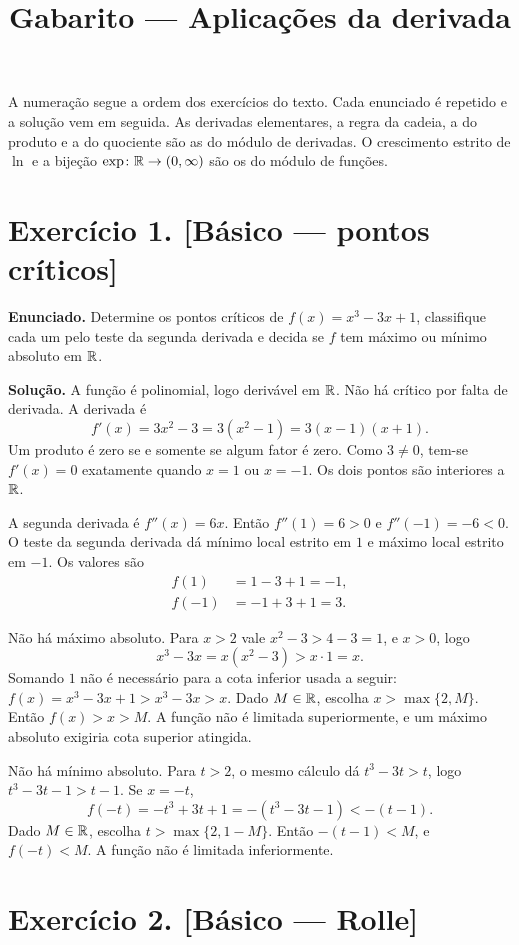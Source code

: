 \documentclass[11pt,a4paper]{article}
\title{Gabarito --- Aplicações da derivada}
\author{}
\date{}
\begin{document}
\maketitle
\tableofcontents

A numeração segue a ordem dos exercícios do texto. Cada enunciado é repetido e a solução vem em seguida. As derivadas elementares, a regra da cadeia, a do produto e a do quociente são as do módulo de derivadas. O crescimento estrito de $\ln$ e a bijeção $\exp\colon\mathbb{R}\to(0,\infty)$ são os do módulo de funções.

\section*{Exercício 1. [Básico --- pontos críticos]}

\textbf{Enunciado.} Determine os pontos críticos de $f(x)=x^3-3x+1$, classifique cada um pelo teste da segunda derivada e decida se $f$ tem máximo ou mínimo absoluto em $\mathbb{R}$.

\textbf{Solução.}
A função é polinomial, logo derivável em $\mathbb{R}$. Não há crítico por falta de derivada. A derivada é
\[
f'(x)=3x^2-3=3(x^2-1)=3(x-1)(x+1).
\]
Um produto é zero se e somente se algum fator é zero. Como $3\neq 0$, tem-se $f'(x)=0$ exatamente quando $x=1$ ou $x=-1$. Os dois pontos são interiores a $\mathbb{R}$.

A segunda derivada é $f''(x)=6x$. Então $f''(1)=6>0$ e $f''(-1)=-6<0$. O teste da segunda derivada dá mínimo local estrito em $1$ e máximo local estrito em $-1$. Os valores são
\begin{align*}
f(1)&=1-3+1=-1,\\
f(-1)&=-1+3+1=3.
\end{align*}

Não há máximo absoluto. Para $x>2$ vale $x^2-3>4-3=1$, e $x>0$, logo
\[
x^3-3x=x(x^2-3)>x\cdot 1=x.
\]
Somando $1$ não é necessário para a cota inferior usada a seguir: $f(x)=x^3-3x+1>x^3-3x>x$. Dado $M\in\mathbb{R}$, escolha $x>\max\{2,M\}$. Então $f(x)>x>M$. A função não é limitada superiormente, e um máximo absoluto exigiria cota superior atingida.

Não há mínimo absoluto. Para $t>2$, o mesmo cálculo dá $t^3-3t>t$, logo $t^3-3t-1>t-1$. Se $x=-t$,
\[
f(-t)=-t^3+3t+1=-(t^3-3t-1)<-(t-1).
\]
Dado $M\in\mathbb{R}$, escolha $t>\max\{2,1-M\}$. Então $-(t-1)<M$, e $f(-t)<M$. A função não é limitada inferiormente.

\section*{Exercício 2. [Básico --- Rolle]}
\end{document}
